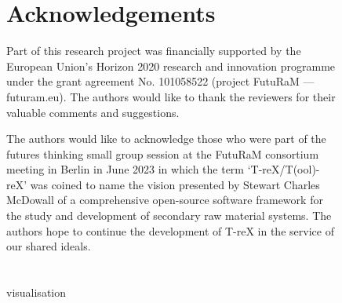 \documentclass[a4paper,fleqn]{cas-dc}
\begin{document}
\begin{figure}[!htbp]
{{\section*{Acknowledgements}
Part of this research project was financially supported by the European Union's Horizon 2020 research and innovation programme under the grant agreement No. 101058522 (project FutuRaM --- futuram.eu). The authors would like to thank the reviewers for their valuable comments and suggestions.

The authors would like to acknowledge those who were part of the futures thinking small group session at the FutuRaM consortium meeting in Berlin in June 2023 in which the term `T-reX/T(ool)-reX' was coined to name the vision presented by Stewart Charles McDowall of a comprehensive open-source software framework for the study and development of secondary raw material systems. The authors hope to continue the development of T-reX in the service of our shared ideals.

}\section*{} visualisation}\label{fig:credit_heatmap}
\end{figure} 





\end{document}
